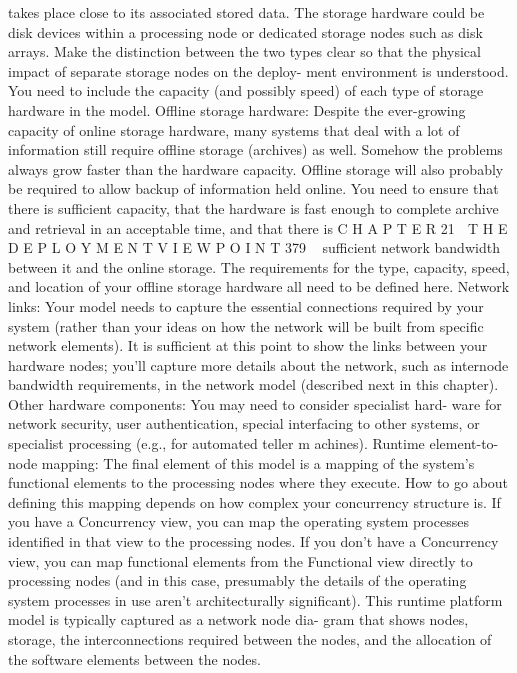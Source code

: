 takes place close to its associated stored data. The storage hardware
could be disk devices within a processing node or dedicated storage
nodes such as disk arrays. Make the distinction between the two types
clear so that the physical impact of separate storage nodes on the deploy-
ment environment is understood. You need to include the capacity (and
possibly speed) of each type of storage hardware in the model.
Offline storage hardware: Despite the ever-growing capacity of online
storage hardware, many systems that deal with a lot of information still
require offline storage (archives) as well. Somehow the problems always
grow faster than the hardware capacity. Offline storage will also probably
be required to allow backup of information held online. You need to
ensure that there is sufficient capacity, that the hardware is fast enough
to complete archive and retrieval in an acceptable time, and that there is
C H A P T E R 21  T H E D E P L O Y M E N T V I E W P O I N T
 379
sufficient network bandwidth between it and the online storage. The
requirements for the type, capacity, speed, and location of your offline
storage hardware all need to be defined here.
Network links: Your model needs to capture the essential connections
required by your system (rather than your ideas on how the network will
be built from specific network elements). It is sufficient at this point to
show the links between your hardware nodes; you’ll capture more details
about the network, such as internode bandwidth requirements, in the
network model (described next in this chapter).
Other hardware components: You may need to consider specialist hard-
ware for network security, user authentication, special interfacing to other
systems, or specialist processing (e.g., for automated teller m achines).
Runtime element-to-node mapping: The final element of this model is a
mapping of the system’s functional elements to the processing nodes
where they execute. How to go about defining this mapping depends on
how complex your concurrency structure is. If you have a Concurrency
view, you can map the operating system processes identified in that view
to the processing nodes. If you don’t have a Concurrency view, you can
map functional elements from the Functional view directly to processing
nodes (and in this case, presumably the details of the operating system
processes in use aren’t architecturally significant).
This runtime platform model is typically captured as a network node dia-
gram that shows nodes, storage, the interconnections required between the
nodes, and the allocation of the software elements between the nodes.
